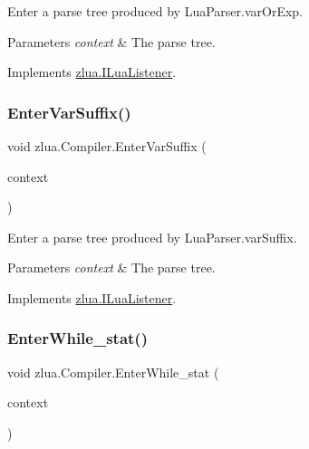 Enter a parse tree produced by Lua\+Parser.\+var\+Or\+Exp. 


\begin{DoxyParams}{Parameters}
{\em context} & The parse tree.\\
\hline
\end{DoxyParams}


Implements \mbox{\hyperlink{interfacezlua_1_1_i_lua_listener_aece0cb0bc8e75c07d7bf71375714a6e7}{zlua.\+I\+Lua\+Listener}}.

\mbox{\label{classzlua_1_1_compiler_a6d026840f7eb9bbbdbc9b279c5929e86}} 
\subsubsection{\texorpdfstring{Enter\+Var\+Suffix()}{EnterVarSuffix()}}
{\footnotesize\ttfamily void zlua.\+Compiler.\+Enter\+Var\+Suffix (\begin{DoxyParamCaption}\item[{\mbox{[}\+Not\+Null\mbox{]} \mbox{\hyperlink{classzlua_1_1_lua_parser_1_1_var_suffix_context}{Lua\+Parser.\+Var\+Suffix\+Context}}}]{context }\end{DoxyParamCaption})}



Enter a parse tree produced by Lua\+Parser.\+var\+Suffix. 


\begin{DoxyParams}{Parameters}
{\em context} & The parse tree.\\
\hline
\end{DoxyParams}


Implements \mbox{\hyperlink{interfacezlua_1_1_i_lua_listener_ad0b34682777b85c6d6fef1d0488b32a4}{zlua.\+I\+Lua\+Listener}}.

\mbox{\label{classzlua_1_1_compiler_a353452b5dbe912d06c08a6429be95906}} 
\subsubsection{\texorpdfstring{Enter\+While\+\_\+stat()}{EnterWhile\_stat()}}
{\footnotesize\ttfamily void zlua.\+Compiler.\+Enter\+While\+\_\+stat (\begin{DoxyParamCaption}\item[{\mbox{[}\+Not\+Null\mbox{]} \mbox{\hyperlink{classzlua_1_1_lua_parser_1_1_while__stat_context}{Lua\+Parser.\+While\+\_\+stat\+Context}}}]{context }\end{DoxyParamCaption})}



